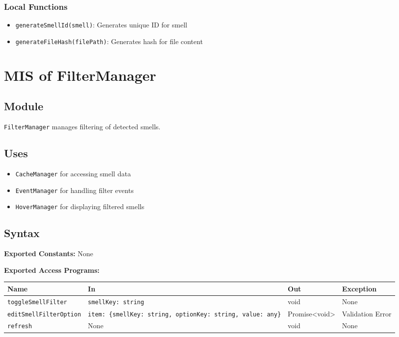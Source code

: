 \documentclass[12pt, titlepage]{article}
\begin{document}
\subsubsection{Local Functions}
\begin{itemize}
\item \texttt{generateSmellId(smell)}: Generates unique ID for smell
\item \texttt{generateFileHash(filePath)}: Generates hash for file content
\end{itemize}

\section{MIS of FilterManager}

\subsection{Module}
\texttt{FilterManager} manages filtering of detected smells.

\subsection{Uses}
\begin{itemize}
\item \texttt{CacheManager} for accessing smell data
\item \texttt{EventManager} for handling filter events
\item \texttt{HoverManager} for displaying filtered smells
\end{itemize}

\subsection{Syntax}

\textbf{Exported Constants:} None

\textbf{Exported Access Programs:}\\
\begin{tabularx}{\linewidth}{|l|>{\raggedright\arraybackslash}X|l|l|}
  \hline
  \textbf{Name} & \textbf{In} & \textbf{Out} & \textbf{Exception} \\
  \hline
  \texttt{toggleSmellFilter} & \texttt{smellKey: string} & void & None \\ \hline
  \texttt{editSmellFilterOption} & \texttt{item: \{smellKey: string, optionKey: string, value: any\}} & Promise<void> & Validation Error \\ \hline
  \texttt{refresh} & None & void & None \\
  \hline
\end{tabularx}
\end{document}
